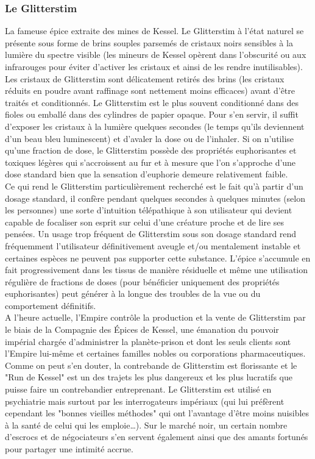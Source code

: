 \documentclass[twoside]{article}
\begin{document}
\subsubsection{Le Glitterstim}
La fameuse épice extraite des mines de Kessel. Le Glitterstim à l'état naturel se présente sous forme de brins souples parsemés de cristaux noirs sensibles à la lumière du spectre visible (les mineurs de Kessel opèrent dans l'obscurité ou aux infrarouges pour éviter d'activer les cristaux et ainsi de les rendre inutilisables). Les cristaux de Glitterstim sont délicatement retirés des brins (les cristaux réduits en poudre avant raffinage sont nettement moins efficaces) avant d'être traités et conditionnés. Le Glitterstim est le plus souvent conditionné dans des fioles ou emballé dans des cylindres de papier opaque. Pour s'en servir, il suffit d'exposer les cristaux à la lumière quelques secondes (le temps qu'ils deviennent d'un beau bleu luminescent) et d'avaler la dose ou de l'inhaler. Si on n'utilise qu'une fraction de dose, le Glitterstim possède des propriétés euphorisantes et toxiques légères qui s'accroissent au fur et à mesure que l'on s'approche d'une dose standard bien que la sensation d'euphorie demeure relativement faible.\\

Ce qui rend le Glitterstim particulièrement recherché est le fait qu'à partir d'un dosage standard, il confère pendant quelques secondes à quelques minutes (selon les personnes) une sorte d'intuition télépathique à son utilisateur qui devient capable de focaliser son esprit sur celui d'une créature proche et de lire ses pensées. Un usage trop fréquent de Glitterstim sous son dosage standard rend fréquemment l'utilisateur définitivement aveugle et/ou mentalement instable et certaines espèces ne peuvent pas supporter cette substance. L'épice s'accumule en fait progressivement dans les tissus de manière résiduelle  et même une utilisation régulière de fractions de doses (pour bénéficier uniquement des propriétés euphorisantes) peut générer à la longue des troubles de la vue ou du comportement définitifs.\\

A l'heure actuelle, l'Empire contrôle la production et la vente de Glitterstim par le biais de la Compagnie des Épices de Kessel, une émanation du pouvoir impérial chargée d'administrer la planète-prison et dont les seuls clients sont l'Empire lui-même et certaines familles nobles ou corporations pharmaceutiques. Comme on peut s'en douter, la contrebande de Glitterstim est florissante et le "Run de Kessel" est un des trajets les plus dangereux et les plus lucratifs que puisse faire un contrebandier entreprenant. Le Glitterstim est utilisé en psychiatrie mais surtout par les interrogateurs impériaux (qui lui préfèrent cependant les "bonnes vieilles méthodes" qui ont l'avantage d'être moins nuisibles à la santé de celui qui les emploie\ldots). Sur le marché noir, un certain nombre d'escrocs et de négociateurs s'en servent également ainsi que des amants fortunés pour partager une intimité accrue.
\end{document}
